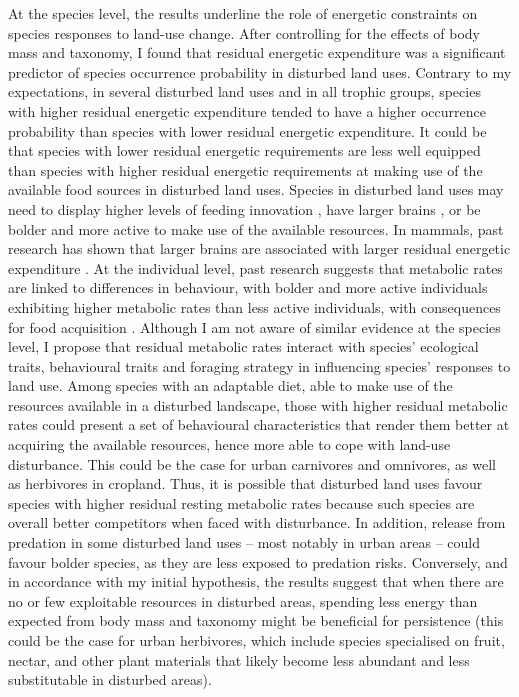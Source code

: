 At the species level, the results underline the role of energetic constraints on species responses to land-use change. After controlling for the effects of body mass and taxonomy, I found that residual energetic expenditure was a significant predictor of species occurrence probability in disturbed land uses. Contrary to my expectations, in several disturbed land uses and in all trophic groups, species with higher residual energetic expenditure tended to have a higher occurrence probability than species with lower residual energetic expenditure. It could be that species with lower residual energetic requirements are less well equipped than species with higher residual energetic requirements at making use of the available food sources in disturbed land uses. Species in disturbed land uses may need to display higher levels of feeding innovation \citep{Coogan2018}, have larger brains \citep{Sayol2020}, or be bolder and more active to make use of the available resources. In mammals, past research has shown that larger brains are associated with larger residual energetic expenditure \citep{Isler2006}. At the individual level, past research suggests that metabolic rates are linked to differences in behaviour, with bolder and more active individuals exhibiting higher metabolic rates than less active individuals, with consequences for food acquisition \citep{Biro2010}. Although I am not aware of similar evidence at the species level, I propose that residual metabolic rates interact with species’ ecological traits, behavioural traits and foraging strategy in influencing species' responses to land use. Among species with an adaptable diet, able to make use of the resources available in a disturbed landscape, those with higher residual metabolic rates could present a set of behavioural characteristics that render them better at acquiring the available resources, hence more able to cope with land-use disturbance. This could be the case for urban carnivores and omnivores, as well as herbivores in cropland. Thus, it is possible that disturbed land uses favour species with higher residual resting metabolic rates because such species are overall better competitors when faced with disturbance. In addition, release from predation in some disturbed land uses – most notably in urban areas – could favour bolder species, as they are less exposed to predation risks. Conversely, and in accordance with my initial hypothesis, the results suggest that when there are no or few exploitable resources in disturbed areas, spending less energy than expected from body mass and taxonomy might be beneficial for persistence (this could be the case for urban herbivores, which include species specialised on fruit, nectar, and other plant materials that likely become less abundant and less substitutable in disturbed areas).

